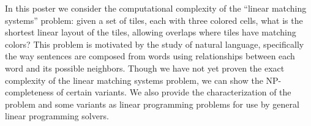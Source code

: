 In this poster we consider the computational complexity of the ``linear
matching systems'' problem: given a set of tiles, each with three colored
cells, what is the shortest linear layout of the tiles, allowing overlaps where
tiles have matching colors? This problem is motivated by the study of natural
language, specifically the way sentences are composed from words using
relationships between each word and its possible neighbors. Though we have not
yet proven the exact complexity of the linear matching systems problem, we can
show the NP-completeness of certain variants. We also provide the
characterization of the problem and some variants as linear programming
problems for use by general linear programming solvers.

